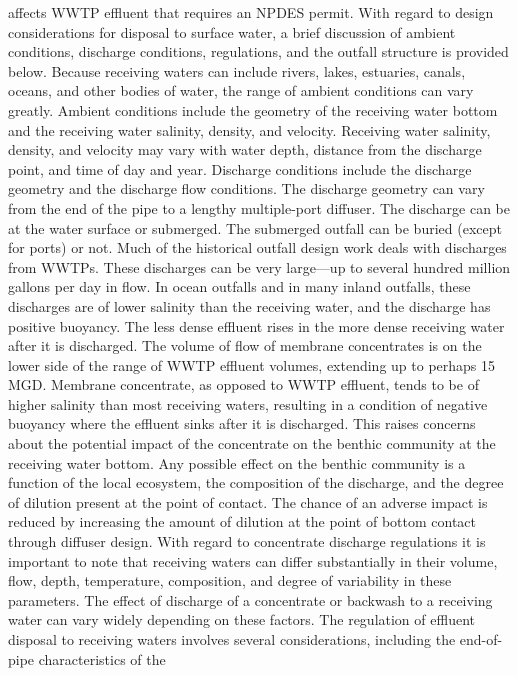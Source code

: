 \documentclass{article}
\begin{document}
affects WWTP effluent that requires an NPDES permit. With regard to
design considerations for disposal to surface water, a brief discussion
of ambient conditions, discharge conditions, regulations, and the
outfall structure is provided below. Because receiving waters can
include rivers, lakes, estuaries, canals, oceans, and other bodies of
water, the range of ambient conditions can vary greatly. Ambient
conditions include the geometry of the receiving water bottom and the
receiving water salinity, density, and velocity. Receiving water
salinity, density, and velocity may vary with water depth, distance from
the discharge point, and time of day and year. Discharge conditions
include the discharge geometry and the discharge flow conditions. The
discharge geometry can vary from the end of the pipe to a lengthy
multiple-port diffuser. The discharge can be at the water surface or
submerged. The submerged outfall can be buried (except for ports) or
not. Much of the historical outfall design work deals with discharges
from WWTPs. These discharges can be very large---up to several hundred
million gallons per day in flow. In ocean outfalls and in many inland
outfalls, these discharges are of lower salinity than the receiving
water, and the discharge has positive buoyancy. The less dense effluent
rises in the more dense receiving water after it is discharged. The
volume of flow of membrane concentrates is on the lower side of the
range of WWTP effluent volumes, extending up to perhaps 15 MGD. Membrane
concentrate, as opposed to WWTP effluent, tends to be of higher salinity
than most receiving waters, resulting in a condition of negative
buoyancy where the effluent sinks after it is discharged. This raises
concerns about the potential impact of the concentrate on the benthic
community at the receiving water bottom. Any possible effect on the
benthic community is a function of the local ecosystem, the composition
of the discharge, and the degree of dilution present at the point of
contact. The chance of an adverse impact is reduced by increasing the
amount of dilution at the point of bottom contact through diffuser
design. With regard to concentrate discharge regulations it is important
to note that receiving waters can differ substantially in their volume,
flow, depth, temperature, composition, and degree of variability in
these parameters. The effect of discharge of a concentrate or backwash
to a receiving water can vary widely depending on these factors. The
regulation of effluent disposal to receiving waters involves several
considerations, including the end-of-pipe characteristics of the
\end{document}
